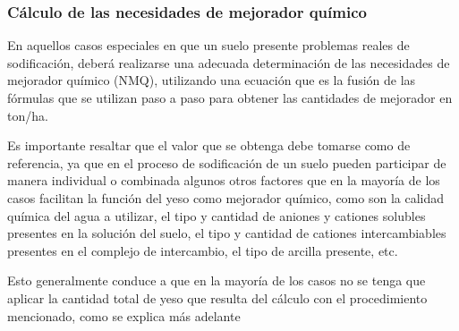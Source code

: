 \subsubsection{Cálculo de las necesidades de mejorador químico}
En aquellos casos especiales en que un suelo presente problemas reales de sodificación, deberá realizarse una adecuada determinación de las necesidades de mejorador químico (NMQ), utilizando una ecuación que es la fusión de las fórmulas que se utilizan paso a paso para obtener las cantidades de mejorador en ton/ha.

Es importante resaltar que el valor que se obtenga debe tomarse como de referencia, ya que en el proceso de sodificación de un suelo pueden participar de manera individual o combinada algunos otros factores que en la mayoría de los casos facilitan la función del yeso como mejorador químico, como son la calidad química del agua a utilizar, el tipo y cantidad de aniones y cationes solubles presentes en la solución del suelo, el tipo y cantidad de cationes intercambiables presentes en el complejo de intercambio, el tipo de arcilla presente, etc.

Esto generalmente conduce a que en la mayoría de los casos no se tenga que aplicar la cantidad total de yeso que resulta del cálculo con el procedimiento mencionado, como se explica más adelante

